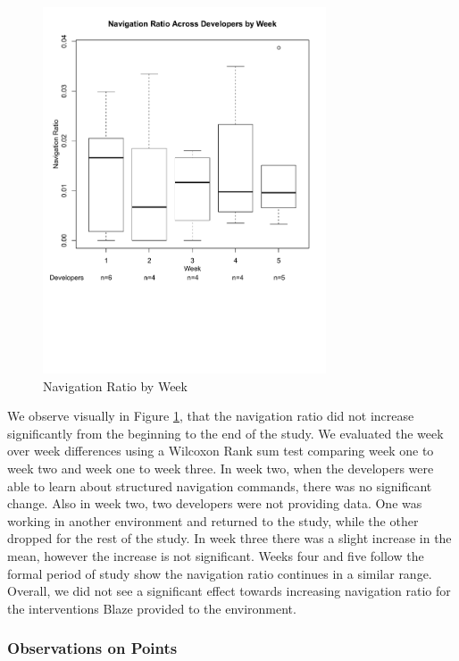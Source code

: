 \documentclass{sig-alternate}
\begin{document}
\begin{figure}
	\includegraphics[width=3.3in]{navratioboxplot_ann.pdf}
	\caption{Navigation Ratio by Week}
	\label{fig:navigationaverage}
\end{figure}

We observe visually in Figure \ref{fig:navigationaverage}, that the navigation ratio did not increase significantly from the beginning to the end of the study.  We evaluated the week over week differences using a Wilcoxon Rank sum test \cite{RefWorks:118} comparing week one to week two and week one to week three.    In week two, when the developers were able to learn about structured navigation commands, there was no significant change.  Also in week two, two developers were not providing data.  One was working in another environment and returned to the study, while the other dropped for the rest of the study.  In week three there was a slight increase in the mean, however the increase is not significant.  Weeks four and five follow the formal period of study show the navigation ratio continues in a similar range.  Overall, we did not see a significant effect towards increasing navigation ratio for the interventions Blaze provided to the environment.    

\subsubsection{Observations on Points}
\end{document}
